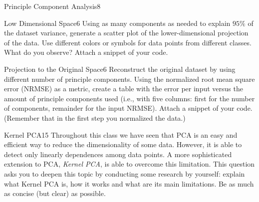 \begin{questions}
\begin{question}{Principle Component Analysis}{8}
\end{question}


\begin{question}{Low Dimensional Space}{6}
Using as many components as needed to explain $95\%$ of the dataset variance, generate a scatter plot of the lower-dimensional projection of the data. Use different colors or symbols for data points from different classes. 
What do you observe? Attach a snippet of your code.

\begin{answer}\end{answer}

\end{question}


\begin{question}{Projection to the Original Space}{6}
Reconstruct the original dataset by using different number of principle components. Using the normalized root mean square error (NRMSE) as a metric, create a table with the error per input versus the amount of principle components used (i.e., with five columns: first for the number of components, remainder for the input NRMSE).
Attach a snippet of your code.
(Remember that in the first step you normalized the data.)

\begin{answer}\end{answer}
\end{question}

\begin{question}[bonus]{Kernel PCA}{15}
Throughout this class we have seen that PCA is an easy and efficient way to reduce the dimensionality of some data. However, it is able to detect only linearly dependences among data points. A more sophisticated extension to PCA, \emph{Kernel PCA}, is able to overcome this limitation. 
This question asks you to deepen this topic by conducting some research by yourself: explain what Kernel PCA is, how it works and what are its main limitations. Be as much as concise (but clear) as possible.

\begin{answer}\end{answer}

\end{question}

\end{questions}
